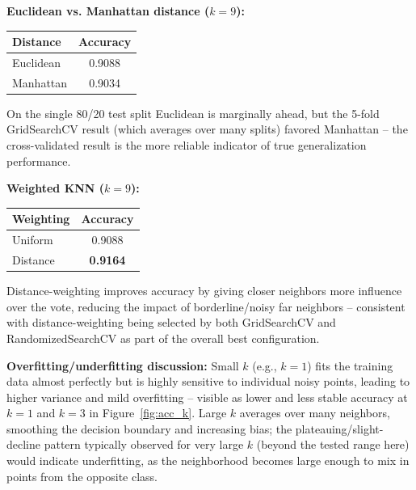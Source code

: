 \documentclass[12pt,a4paper]{article}
\newenvironment{fitwidth}
  {\begin{lrbox}{\fitbox}}
  {\end{lrbox}\ifdim\wd\fitbox>\linewidth\resizebox{\linewidth}{!}{\usebox{\fitbox}}\else\usebox{\fitbox}\fi}
\DeclareRobustCommand{\_}{\textunderscore\allowbreak}
\begin{document}
\vspace{0.3cm}
\begin{center}
\begin{minipage}{\linewidth}\centering
\textbf{Euclidean vs. Manhattan distance ($k=9$):}\par\smallskip
\begin{fitwidth}
\begin{tabular}{lc}
\toprule
Distance & Accuracy \\
\midrule
Euclidean & 0.9088 \\
Manhattan & 0.9034 \\
\bottomrule
\end{tabular}
\end{fitwidth}
\end{minipage}
\end{center}
\noindent On the single 80/20 test split Euclidean is marginally ahead, but the
5-fold GridSearchCV result (which averages over many splits) favored
Manhattan -- the cross-validated result is the more reliable indicator of
true generalization performance.

\vspace{0.3cm}
\begin{center}
\begin{minipage}{\linewidth}\centering
\textbf{Weighted KNN ($k=9$):}\par\smallskip
\begin{fitwidth}
\begin{tabular}{lc}
\toprule
Weighting & Accuracy \\
\midrule
Uniform  & 0.9088 \\
Distance & \textbf{0.9164} \\
\bottomrule
\end{tabular}
\end{fitwidth}
\end{minipage}
\end{center}
\noindent Distance-weighting improves accuracy by giving closer neighbors more
influence over the vote, reducing the impact of borderline/noisy far
neighbors -- consistent with distance-weighting being selected by both
GridSearchCV and RandomizedSearchCV as part of the overall best
configuration.

\vspace{0.3cm}
\textbf{Overfitting/underfitting discussion:} Small $k$ (e.g., $k=1$) fits
the training data almost perfectly but is highly sensitive to individual
noisy points, leading to higher variance and mild overfitting -- visible as
lower and less stable accuracy at $k=1$ and $k=3$ in
Figure~\ref{fig:acc_k}. Large $k$ averages over many neighbors, smoothing
the decision boundary and increasing bias; the plateauing/slight-decline
pattern typically observed for very large $k$ (beyond the tested range here)
would indicate underfitting, as the neighborhood becomes large enough to mix
in points from the opposite class.
\end{document}
